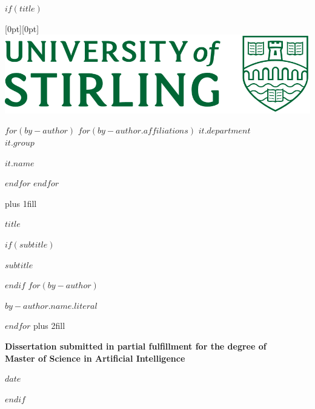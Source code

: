 
$if(title)$

\cleardoublepage
\thispagestyle{empty}

\hspace{10cm} %
\raisebox{0.75cm}[0pt][0pt]{\includegraphics[width=0.4\linewidth]{uos_logo.png}}

\begin{center}

$for(by-author)$
$for(by-author.affiliations)$
{\Large \textit{$it.department$} \\}
{\Large \textit{$it.group$} \\}
{\Large \textit{$it.name$} \par}
$endfor$
$endfor$

\hbox{}\vskip 0cm plus 1fill
{\LARGE\bfseries $title$ \par}
$if(subtitle)$
{\Large\bfseries $subtitle$ \par}
$endif$
\vspace{10ex}
$for(by-author)$
{\Large\bfseries $by-author.name.literal$ \par}
$endfor$
\vskip 0.5cm plus 2fill

{\bfseries Dissertation submitted in partial fulfillment for the degree of \\
Master of Science in Artificial Intelligence \par}
\vspace{2ex}
{\bfseries $date$ \par}

\end{center}
$endif$

\clearpage
{}
\setcounter{page}{1}
